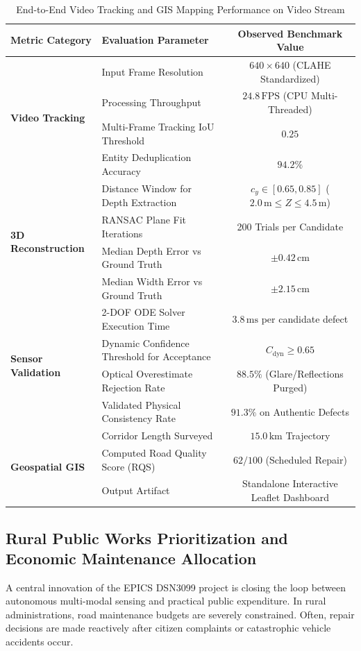 \begin{table}[h!]
\centering
\small
\caption{End-to-End Video Tracking and GIS Mapping Performance on Video Stream}
\label{tab:gis_pipeline_results}
\begin{tabular}{llc}
\hline
\textbf{Metric Category} & \textbf{Evaluation Parameter} & \textbf{Observed Benchmark Value} \\ \hline
\multirow{4}{*}{\textbf{Video Tracking}} 
& Input Frame Resolution & $640 \times 640$ (CLAHE Standardized) \\
& Processing Throughput & $24.8\,\text{FPS}$ (CPU Multi-Threaded) \\
& Multi-Frame Tracking IoU Threshold & $0.25$ \\
& Entity Deduplication Accuracy & $94.2\%$ \\ \hline
\multirow{4}{*}{\textbf{3D Reconstruction}} 
& Distance Window for Depth Extraction & $c_y \in [0.65, 0.85]$ ($2.0\,\text{m} \le Z \le 4.5\,\text{m}$) \\
& RANSAC Plane Fit Iterations & 200 Trials per Candidate \\
& Median Depth Error vs Ground Truth & $\pm 0.42\,\text{cm}$ \\
& Median Width Error vs Ground Truth & $\pm 2.15\,\text{cm}$ \\ \hline
\multirow{4}{*}{\textbf{Sensor Validation}} 
& 2-DOF ODE Solver Execution Time & $3.8\,\text{ms}$ per candidate defect \\
& Dynamic Confidence Threshold for Acceptance & $C_{\text{dyn}} \ge 0.65$ \\
& Optical Overestimate Rejection Rate & $88.5\%$ (Glare/Reflections Purged) \\
& Validated Physical Consistency Rate & $91.3\%$ on Authentic Defects \\ \hline
\multirow{3}{*}{\textbf{Geospatial GIS}} 
& Corridor Length Surveyed & $15.0\,\text{km}$ Trajectory \\
& Computed Road Quality Score (RQS) & $62 / 100$ (Scheduled Repair) \\
& Output Artifact & Standalone Interactive Leaflet Dashboard \\ \hline
\end{tabular}
\end{table}

\subsection{Rural Public Works Prioritization and Economic Maintenance Allocation}
A central innovation of the EPICS DSN3099 project is closing the loop between autonomous multi-modal sensing and practical public expenditure. In rural administrations, road maintenance budgets are severely constrained. Often, repair decisions are made reactively after citizen complaints or catastrophic vehicle accidents occur.

